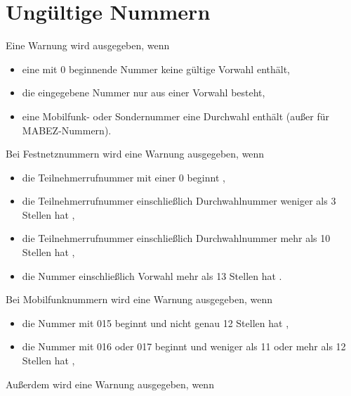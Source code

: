 \documentclass[numbers=noenddot]{scrreprt}
\newcommand\UeberschriftUngueltig{\section{Ungültige Nummern}}
\newcommand\WarnungWenn{Eine Warnung wird ausgegeben, wenn}
\begin{document}
\UeberschriftUngueltig
\WarnungWenn
\begin{itemize}
\item eine mit 0 beginnende Nummer keine gültige Vorwahl enthält,
\item die eingegebene Nummer nur aus einer Vorwahl besteht,
\item eine Mobilfunk- oder Sondernummer eine Durchwahl enthält (außer für MABEZ-Nummern).
\end{itemize}
Bei Festnetznummern wird eine Warnung ausgegeben, wenn
\begin{itemize}
\item die Teilnehmerrufnummer mit einer 0 beginnt \cite[5]{BNA-nummernplan},
\item die Teilnehmerrufnummer einschließlich Durchwahlnummer weniger als 3 Stellen hat \cite[5]{BNA-nummernplan},
\item die Teilnehmerrufnummer einschließlich Durchwahlnummer mehr als 10 Stellen hat \cite[2]{BNA-Struktur},
\item die Nummer einschließlich Vorwahl mehr als 13 Stellen hat \cite[2]{BNA-Struktur}.
\end{itemize}
Bei Mobilfunknummern wird eine Warnung ausgegeben, wenn
\begin{itemize}
\item die Nummer mit 015 beginnt und nicht genau 12 Stellen hat \cite[49\psq]{BNA-konzept},
\item die Nummer mit 016 oder 017 beginnt und weniger als 11 oder mehr als 12 Stellen hat \cite[50]{BNA-konzept},
\end{itemize}
Außerdem wird eine Warnung ausgegeben, wenn
\end{document}
